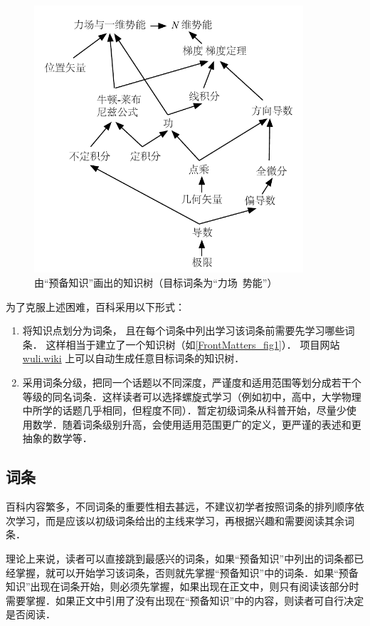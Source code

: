 \begin{figure}[ht]
\centering
\includegraphics[width=10cm]{./figures/flowchart_example.pdf}
\caption{由“预备知识”画出的知识树（目标词条为“力场\ 势能”）}\label{FrontMatters_fig1}
\end{figure}

为了克服上述困难，百科采用以下形式：
\begin{enumerate}
\item 将知识点划分为词条， 且在每个词条中列出学习该词条前需要先学习哪些词条． 这样相当于建立了一个知识树（如\autoref{FrontMatters_fig1}）． 项目网站 \href{https://wuli.wiki}{wuli.wiki} 上可以自动生成任意目标词条的知识树．
\item 采用词条分级，把同一个话题以不同深度，严谨度和适用范围等划分成若干个等级的同名词条．这样读者可以选择螺旋式学习（例如初中，高中，大学物理中所学的话题几乎相同，但程度不同）．暂定初级词条从科普开始，尽量少使用数学．随着词条级别升高，会使用适用范围更广的定义，更严谨的表述和更抽象的数学等．
\end{enumerate}

\subsection{词条}
百科内容繁多，不同词条的重要性相去甚远，不建议初学者按照词条的排列顺序依次学习，而是应该以初级词条给出的主线来学习，再根据兴趣和需要阅读其余词条．

理论上来说，读者可以直接跳到最感兴的词条，如果“预备知识”中列出的词条都已经掌握，就可以开始学习该词条，否则就先掌握“预备知识”中的词条．如果“预备知识”出现在词条开始，则必须先掌握，如果出现在正文中，则只有阅读该部分时需要掌握．如果正文中引用了没有出现在“预备知识”中的内容，则读者可自行决定是否阅读．

